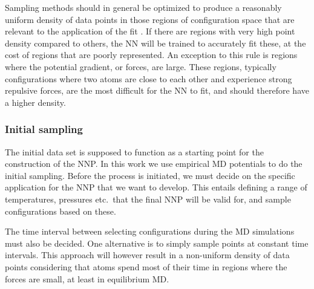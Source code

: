 \documentclass[twoside,english]{uiofysmaster}
\begin{document}
Sampling methods should in general be optimized to produce a reasonably uniform density of 
data points in those regions of configuration space that are relevant to the application of the fit \cite{Raff12}. 
If there are regions with very high point density compared to others, the NN will be trained to accurately fit these, 
at the cost of regions that are poorly represented. An exception to this rule is regions where the potential gradient, or forces, 
are large. These regions, typically configurations where two atoms are close to each other and experience strong
repulsive forces, are the most difficult for the NN to fit, 
and should therefore have a higher density. 

\subsubsection{Initial sampling}
The initial data set is supposed to function as a starting point for the construction of the NNP. 
In this work we use empirical MD potentials to do the initial sampling. Before the process is initiated, 
we must decide on the specific application for the NNP that we want to develop. This entails 
defining a range of temperatures, pressures etc.\ that the final NNP will be valid for, and sample
configurations based on these. 

The time interval between selecting configurations during the MD simulations must also be decided. 
One alternative is to simply sample points at constant time intervals. This approach will
however result in a non-uniform density of data points considering that atoms spend most of their time
in regions where the forces are small, at least in equilibrium MD. 
\end{document}
